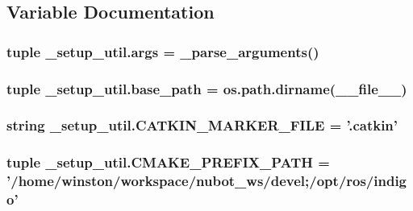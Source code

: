\subsection{Variable Documentation}
\hypertarget{namespace__setup__util_ac67cb2d93e0636936bcbeb363e2c87c3}{
\subsubsection[{args}]{\setlength{\rightskip}{0pt plus 5cm}tuple \-\_\-setup\-\_\-util.\-args = {\bf \-\_\-parse\-\_\-arguments}()}}\label{namespace__setup__util_ac67cb2d93e0636936bcbeb363e2c87c3}
\hypertarget{namespace__setup__util_aecc545d18611814ee5d7ccdf6aa55f90}{
\subsubsection[{base\-\_\-path}]{\setlength{\rightskip}{0pt plus 5cm}tuple \-\_\-setup\-\_\-util.\-base\-\_\-path = os.\-path.\-dirname(\-\_\-\-\_\-file\-\_\-\-\_\-)}}\label{namespace__setup__util_aecc545d18611814ee5d7ccdf6aa55f90}
\hypertarget{namespace__setup__util_a3fa0ca5a460a71a43cbc3d4954ab1f10}{
\subsubsection[{C\-A\-T\-K\-I\-N\-\_\-\-M\-A\-R\-K\-E\-R\-\_\-\-F\-I\-L\-E}]{\setlength{\rightskip}{0pt plus 5cm}string \-\_\-setup\-\_\-util.\-C\-A\-T\-K\-I\-N\-\_\-\-M\-A\-R\-K\-E\-R\-\_\-\-F\-I\-L\-E = '.catkin'}}\label{namespace__setup__util_a3fa0ca5a460a71a43cbc3d4954ab1f10}
\hypertarget{namespace__setup__util_a44bed5f85daa4641b3c144edb9e8c1c1}{
\subsubsection[{C\-M\-A\-K\-E\-\_\-\-P\-R\-E\-F\-I\-X\-\_\-\-P\-A\-T\-H}]{\setlength{\rightskip}{0pt plus 5cm}tuple \-\_\-setup\-\_\-util.\-C\-M\-A\-K\-E\-\_\-\-P\-R\-E\-F\-I\-X\-\_\-\-P\-A\-T\-H = '/home/winston/workspace/nubot\-\_\-ws/devel;/opt/ros/indigo'}}\label{namespace__setup__util_a44bed5f85daa4641b3c144edb9e8c1c1}
